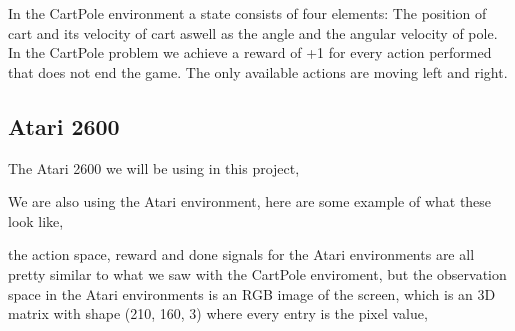 \documentclass[11pt]{article}
\begin{document}
In the CartPole environment a state consists of four elements: The position of cart and its velocity of cart aswell as the angle and the angular velocity of pole. In the CartPole problem we achieve a reward of +1 for every action performed that does not end the game. The only available actions are moving left and right.


\subsection{Atari 2600}

The Atari 2600 we will be using in this project, 



We are also using the Atari environment, here are some example of what these look like,

the action space, reward and done signals for the Atari environments are all pretty similar to what we saw with the CartPole enviroment, but the observation space in the Atari environments is an RGB image of the screen, which is an 3D matrix with shape (210, 160, 3) where every entry is the pixel value,
\end{document}
